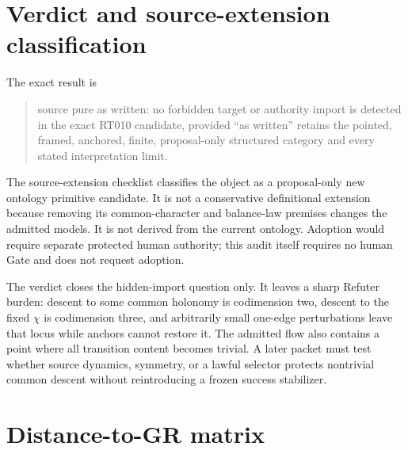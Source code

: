\documentclass[11pt]{article}
\newcommand{\status}[1]{\textsf{#1}}
\begin{document}
\section{Verdict and source-extension classification}

The exact result is
\begin{quote}
\status{source pure as written}: no forbidden target or authority import is
detected in the exact RT010 candidate, provided ``as written'' retains the
pointed, framed, anchored, finite, proposal-only structured category and every
stated interpretation limit.
\end{quote}
The source-extension checklist classifies the object as a
\status{proposal-only new ontology primitive candidate}.  It is not a
conservative definitional extension because removing its common-character and
balance-law premises changes the admitted models.  It is not derived from the
current ontology.  Adoption would require separate protected human authority;
this audit itself requires no human Gate and does not request adoption.

The verdict closes the hidden-import question only.  It leaves a sharp Refuter
burden: descent to some common holonomy is codimension two, descent to the fixed
$\chi$ is codimension three, and arbitrarily small one-edge perturbations leave
that locus while anchors cannot restore it.  The admitted flow also contains a
point where all transition content becomes trivial.  A later packet must test
whether source dynamics, symmetry, or a lawful selector protects nontrivial
common descent without reintroducing a frozen success stabilizer.

\section{Distance-to-GR matrix}
\end{document}
